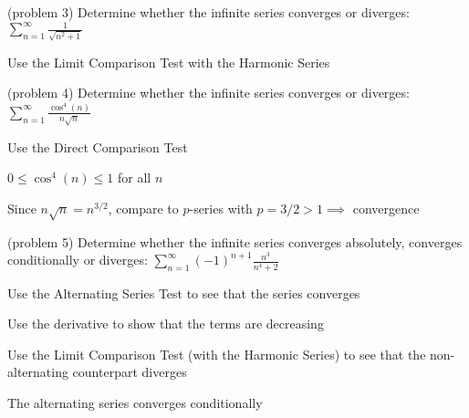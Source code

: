 \documentclass[handout]{ximera}
\begin{document}
\begin{problem}(problem 3)
Determine whether the infinite series converges or diverges: 
$\displaystyle \sum_{n=1}^\infty \frac{1}{\sqrt{n^2 + 1}}$

\begin{hint}
Use the Limit Comparison Test with the Harmonic Series
\end{hint}


\end{problem}

\begin{problem}(problem 4)
Determine whether the infinite series converges or diverges: $\displaystyle \sum_{n=1}^\infty \frac{\cos^4(n)}{n\sqrt{n}}$

\begin{hint}
Use the Direct Comparison Test
\end{hint}

\begin{hint}
$\displaystyle 0 \leq \cos^4(n) \leq 1$ for all $n$
\end{hint}

\begin{hint}
Since $n\sqrt n = n^{3/2}$, compare to $p$-series with $p = 3/2 > 1 \implies$ convergence
\end{hint}

\end{problem}

\begin{problem}(problem 5)
Determine whether the infinite series converges absolutely, converges conditionally or diverges: 
$\displaystyle \sum_{n=1}^\infty (-1)^{n+1} \frac{n^3}{n^4 + 2}$

\begin{hint}
Use the Alternating Series Test to see that the series converges
\end{hint}
\begin{hint}
Use the derivative to show that the terms are decreasing
\end{hint}
\begin{hint}
Use the Limit Comparison Test (with the Harmonic Series) to see that the 
non-alternating counterpart diverges
\end{hint}


\begin{hint}
The alternating series converges conditionally
\end{hint}

\end{problem}
\end{document}
